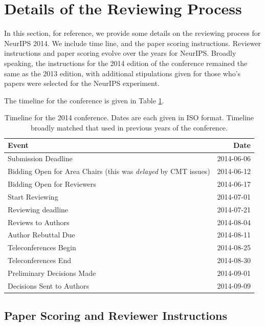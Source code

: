 \section{Details of the Reviewing Process}
\label{app:review-details}

In this section, for reference, we provide some details on the reviewing process for NeurIPS 2014. We include time line, and the paper scoring instructions. Reviewer instructions and paper scoring evolve over the years for NeurIPS. Broadly speaking, the instructions for the 2014 edition of the conference remained the same as the 2013 edition, with additional stipulations given for those who's papers were selected for the NeurIPS experiment.

The timeline for the conference is given in Table \ref{table-reviewing-timeline}.


\begin{table}[hb]
    \centering
    \caption{Timeline for the 2014 conference. Dates are each given in ISO format. Timeline broadly matched that used in previous years of the conference.}
    \label{table-reviewing-timeline}
    
    \begin{tabular}{l|r}
    Event & Date \\ \hline
    
        Submission Deadline & 2014-06-06  \\
        Bidding Open for Area Chairs (this was \emph{delayed} by
  CMT issues) & 2014-06-12 \\
  Bidding Open for Reviewers & 2014-06-17 \\
  Start Reviewing & 2014-07-01 \\
  Reviewing deadline & 2014-07-21 \\
  Reviews to Authors & 2014-08-04 \\
  Author Rebuttal Due & 2014-08-11 \\
  Teleconferences Begin & 2014-08-25 \\
  Teleconferences End & 2014-08-30 \\
  Preliminary Decisions Made & 2014-09-01 \\
  Decisions Sent to Authors & 2014-09-09
    \end{tabular}
    
\end{table}

\subsection{Paper Scoring and Reviewer
Instructions}\label{paper-scoring-and-reviewer-instructions}

